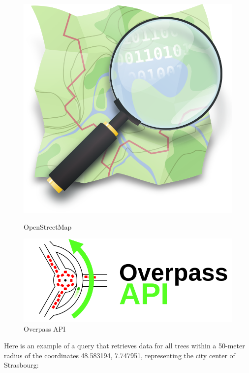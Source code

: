 \documentclass[12pt]{article}
\begin{document}
\begin{figure}[H]
    \centering
    \begin{minipage}{0.45\textwidth}
        \centering
        \includegraphics[width=\textwidth]{images/OSM_logo.png}
        \caption{OpenStreetMap \cite{openstreetmap}}
    \end{minipage}
    \begin{minipage}{0.45\textwidth}
        \centering
        \includegraphics[width=\textwidth]{images/OvAPI_logo.png}
        \caption{Overpass API \cite{overpass}}
    \end{minipage}\hfill
\end{figure}

\newpage
Here is an example of a query that retrieves data for all trees within a 50-meter
radius of the coordinates 48.583194, 7.747951, representing the city center of Strasbourg:
\end{document}
